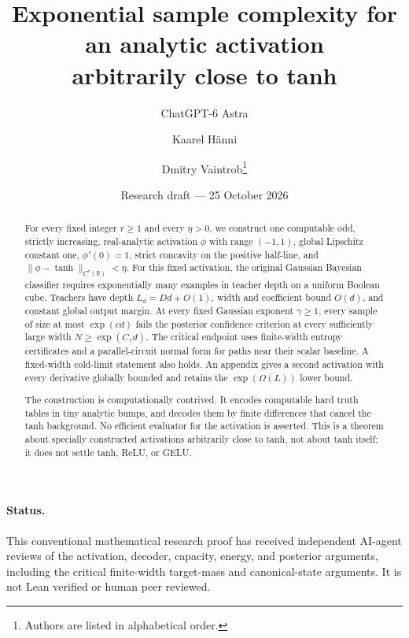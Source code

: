 \documentclass[11pt]{article}
\title{Exponential sample complexity for an analytic activation\\
arbitrarily close to tanh}
\author{ChatGPT-6 Astra \and Kaarel H\"anni \and Dmitry Vaintrob\thanks{Authors are listed in alphabetical order.}}
\date{Research draft --- 25 October 2026}
\theoremstyle{remark}\newtheorem{remark}[theorem]{Remark}
\newcommand{\R}{\mathbb R}
\begin{document}
\maketitle
\begin{abstract}
For every fixed integer $r\ge1$ and every $\eta>0$, we construct one
computable odd, strictly increasing, real-analytic activation $\phi$
with range $(-1,1)$, global Lipschitz constant one, $\phi'(0)=1$,
strict concavity on the positive half-line, and
$\|\phi-\tanh\|_{C^r(\R)}<\eta$.
For this fixed activation, the original Gaussian Bayesian classifier
requires exponentially many examples in teacher depth on a uniform
Boolean cube. Teachers have depth $L_d=Dd+O(1)$, width and coefficient
bound $O(d)$, and constant global output margin. At every fixed
Gaussian exponent $\gamma\ge1$, every sample of size at most $\exp(cd)$
fails the posterior confidence criterion at every sufficiently large
width $N\ge\exp(C_\gamma d)$. The critical endpoint uses finite-width
entropy certificates and a parallel-circuit normal form for paths
near their scalar baseline. A fixed-width cold-limit statement also holds.
An appendix gives a second activation with every derivative globally
bounded and retains the $\exp(\Omega(L))$ lower bound.

The construction is computationally contrived. It encodes computable
hard truth tables in tiny analytic bumps, and decodes them by finite
differences that cancel the tanh background. No efficient evaluator
for the activation is asserted. This is a theorem about specially
constructed activations arbitrarily close to tanh, not about tanh
itself; it does not settle tanh, ReLU, or GELU.
\end{abstract}
\paragraph{Status.}
This conventional mathematical research proof has received independent
AI-agent reviews of the activation, decoder, capacity, energy, and posterior
arguments, including the critical finite-width target-mass and
canonical-state arguments. It is not Lean verified or human peer reviewed.
\end{document}
